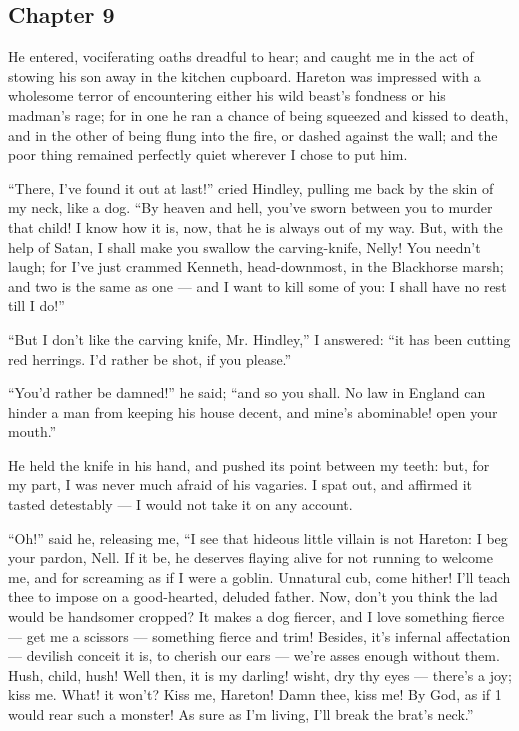 \subsection*{Chapter 9}

\par He entered, vociferating oaths dreadful to hear; and caught me in the act of stowing his son away in the kitchen cupboard. Hareton was impressed with a wholesome terror of encountering either his wild beast's fondness or his madman's rage; for in one he ran a chance of being squeezed and kissed to death, and in the other of being flung into the fire, or dashed against the wall; and the poor thing remained perfectly quiet wherever I chose to put him.
\par “There, I've found it out at last!” cried Hindley, pulling me back by the skin of my neck, like a dog. “By heaven and hell, you've sworn between you to murder that child! I know how it is, now, that he is always out of my way. But, with the help of Satan, I shall make you swallow the carving-knife, Nelly! You needn't laugh; for I've just crammed Kenneth, head-downmost, in the Blackhorse marsh; and two is the same as one — and I want to kill some of you: I shall have no rest till I do!”
\par “But I don't like the carving knife, Mr. Hindley,” I answered: “it has been cutting red herrings. I'd rather be shot, if you please.”
\par “You'd rather be damned!” he said; “and so you shall. No law in England can hinder a man from keeping his house decent, and mine's abominable! open your mouth.”
\par He held the knife in his hand, and pushed its point between my teeth: but, for my part, I was never much afraid of his vagaries. I spat out, and affirmed it tasted detestably — I would not take it on any account.
\par “Oh!” said he, releasing me, “I see that hideous little villain is not Hareton: I beg your pardon, Nell. If it be, he deserves flaying alive for not running to welcome me, and for screaming as if I were a goblin. Unnatural cub, come hither! I'll teach thee to impose on a good-hearted, deluded father. Now, don't you think the lad would be handsomer cropped? It makes a dog fiercer, and I love something fierce — get me a scissors — something fierce and trim! Besides, it's infernal affectation— devilish conceit it is, to cherish our ears — we're asses enough without them. Hush, child, hush! Well then, it is my darling! wisht, dry thy eyes — there's a joy; kiss me. What! it won't? Kiss me, Hareton! Damn thee, kiss me! By God, as if 1 would rear such a monster! As sure as I'm living, I'll break the brat's neck.”
